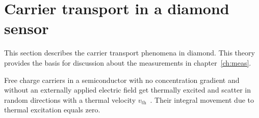 \section{Carrier transport in a diamond sensor} 
\label{sec:carrtransp}
This section describes the carrier transport phenomena in diamond. This theory provides the basis for discussion about the measurements in chapter~\ref{ch:meas}. 

Free charge carriers in a semiconductor with no concentration gradient and without an externally applied electric field get thermally excited and scatter in random directions with a thermal velocity $v_{\mathrm{th}}$~\cite{}. Their integral movement due to thermal excitation equals zero. 

